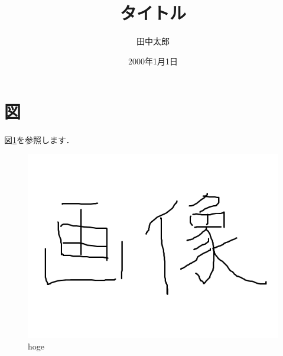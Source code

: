 \documentclass[a4paper,10pt]{jsarticle}
\title{タイトル}%
\author{田中太郎}%
\date{2000年1月1日}%
\begin{document}
\maketitle%

\section{図}
図\ref{fig:hoge}を参照します．
\begin{figure}[H]
    \begin{center}
        \includegraphics[width=120mm]{fig/image1.png}
    \end{center}
    \caption{hoge}
    \label{fig:hoge}
\end{figure}
\end{document}
